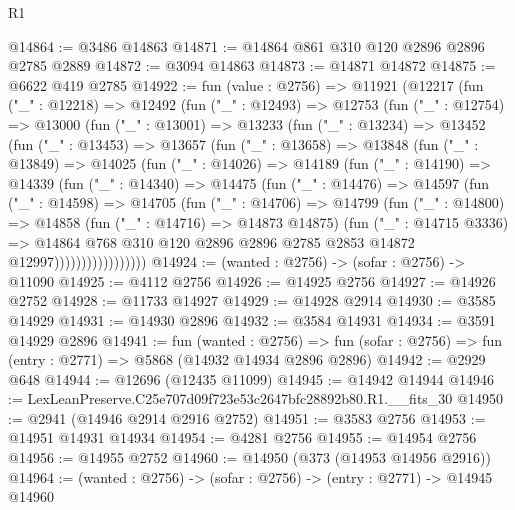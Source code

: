 \begin{lexlean}{R1}
\begin{coremodule}
@14864 := @3486 @14863
@14871 := @14864 @861 @310 @120 @2896 @2896 @2785 @2889
@14872 := @3094 @14863
@14873 := @14871 @14872
@14875 := @6622 @419 @2785
@14922 := fun (value : @2756) =>
  @11921
    (@12217
      (fun ("_" : @12218) =>
      @12492
        (fun ("_" : @12493) =>
        @12753
          (fun ("_" : @12754) =>
          @13000
            (fun ("_" : @13001) =>
            @13233
              (fun ("_" : @13234) =>
              @13452
                (fun ("_" : @13453) =>
                @13657
                  (fun ("_" : @13658) =>
                  @13848
                    (fun ("_" : @13849) =>
                    @14025
                      (fun ("_" : @14026) =>
                      @14189
                        (fun ("_" : @14190) =>
                        @14339
                          (fun ("_" : @14340) =>
                          @14475
                            (fun ("_" : @14476) =>
                            @14597
                              (fun ("_" : @14598) =>
                              @14705
                                (fun ("_" : @14706) =>
                                @14799
                                  (fun ("_" : @14800) =>
                                  @14858
                                    (fun ("_" : @14716) => @14873 @14875)
                                    (fun ("_" : @14715 @3336) =>
                                    @14864
                                      @768
                                      @310
                                      @120
                                      @2896
                                      @2896
                                      @2785
                                      @2853
                                      @14872
                                      @12997)))))))))))))))))
@14924 := (wanted : @2756) -> (sofar : @2756) -> @11090
@14925 := @4112 @2756
@14926 := @14925 @2756
@14927 := @14926 @2752
@14928 := @11733 @14927
@14929 := @14928 @2914
@14930 := @3585 @14929
@14931 := @14930 @2896
@14932 := @3584 @14931
@14934 := @3591 @14929 @2896
@14941 := fun (wanted : @2756) =>
  fun (sofar : @2756) => fun (entry : @2771) => @5868 (@14932 @14934 @2896 @2896)
@14942 := @2929 @648
@14944 := @12696 (@12435 @11099)
@14945 := @14942 @14944
@14946 := LexLeanPreserve.C25e707d09f723e53c2647bfc28892b80.R1.__fits_30
@14950 := @2941 (@14946 @2914 @2916 @2752)
@14951 := @3583 @2756
@14953 := @14951 @14931 @14934
@14954 := @4281 @2756
@14955 := @14954 @2756
@14956 := @14955 @2752
@14960 := @14950 (@373 (@14953 @14956 @2916))
@14964 := (wanted : @2756) -> (sofar : @2756) -> (entry : @2771) -> @14945 @14960

\end{coremodule}
\end{lexlean}
